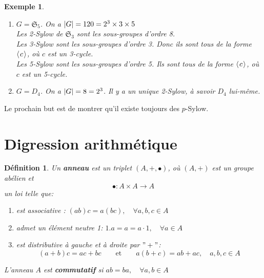 \documentclass[a4paper, oneside]{report}
\theoremstyle{break}
\newtheorem{definition}[thm]{Définition}
\newtheorem{exemple}[thm]{Exemple}
\newcommand{\sg}{sous-groupe }
\newcommand{\x}{\times}
\renewcommand{\S}{\mathfrak{S}}
\DeclarePairedDelimiter\abs{\lvert}{\rvert}%
\newcommand{\pro}[1]{\langle\hspace{0.1em}#1\hspace{0.1em}\rangle}
\newcommand{\slign}{\textbf}
\begin{document}
\begin{exemple}
\begin{enumerate}
\begin{itemize}
\item les deux 4-cycles : $\sigma$ et 
\begin{align*}
\sigma^{-1} &= (a \; b \; c \; d)
\\
&= (a \; c) \sigma (a \; c)^{-1}
\\
&= (b \; d) \sigma (b \; d)^{-1}
\end{align*}
\end{itemize}
Notons que $P$ n'est pas distingué dans $\S_4$.\\
Les 3-Sylow de $\mathfrak{S}_4$ sont les sous-groupes d'ordre 3.\\
Ils sont tous de la forme $\pro{c}$, où $c$ est un 3-cycle (exercice : compter le nombre de 3-cycles et le nombre de \sg d'ordre 3). Ils sont tous conjugués.\\

\item $G = \mathfrak{S}_5$. On a $\abs{G} = 120 = 2^3 \x 3 \x 5$\\
Les 2-Sylow de $\mathfrak{S}_3$ sont les sous-groupes d'ordre 8.\\
Les 3-Sylow sont les sous-groupes d'ordre 3. Donc ils sont tous de la forme $\pro{c}$, où $c$ est un 3-cycle.\\
Les 5-Sylow sont les sous-groupes d'ordre 5. Ils sont tous de la forme $\pro{c}$, où $c$ est un 5-cycle.\\
\item $G = D_4$. On a $\abs{G} = 8 = 2^3$. Il y a un unique 2-Sylow, à savoir $D_4$ lui-même.
\end{enumerate}
\end{exemple}
Le prochain but est de montrer qu'il existe toujours des $p$-Sylow.

\section{Digression arithmétique}

\begin{definition}
Un \slign{anneau} est un triplet $(A, +, \bullet)$, où $(A, +)$ est un groupe abélien et
\[
\bullet : A \times A \longrightarrow A
\]
un loi telle que:
\begin{enumerate}
\item est associative :	\quad	$(ab)c = a(bc),	\quad	\forall a, b, c \in A$
\item admet un élément neutre 1:	\quad	$1.a = a = a \cdot 1,	\quad	\forall a \in A$
\item est distributive à gauche et à droite par $"+"$:
\[
(a + b) c = ac + bc		\qquad	\text{et}	\qquad	a(b + c) = ab + ac, \quad	a, b, c \in A
\]
\end{enumerate}
L'anneau $A$ est \slign{commutatif} si $ab = ba,	\quad	\forall a, b \in A$
\end{definition}
\end{document}
